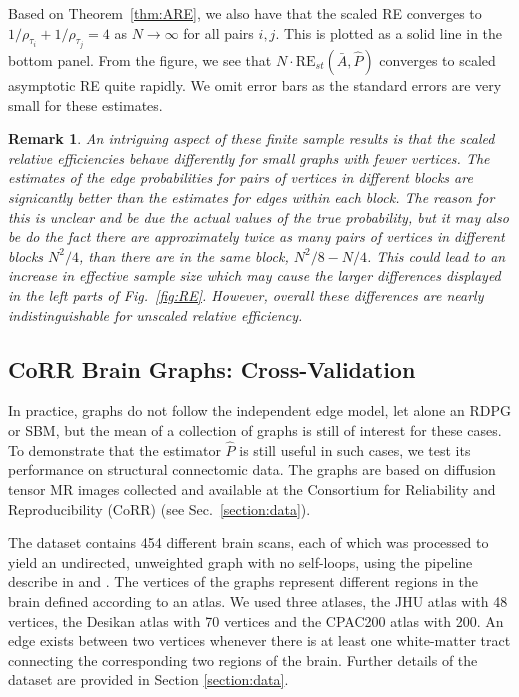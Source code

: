 \documentclass[10pt,letterpaper]{article}
\newtheorem{remark}[fact]{Remark}
\begin{document}
Based on Theorem~\ref{thm:ARE}, we also have that the scaled RE converges to $1/\rho_{\tau_i}+1/\rho_{\tau_j}=4$ as $N\to\infty$ for all pairs $i,j$.
This is plotted as a solid line in the bottom panel.
From the figure, we see that $N \cdot \mathrm{RE}_{st}(\bar{A}, \hat{P})$ converges to scaled asymptotic RE quite rapidly.
We omit error bars as the standard errors are very small for these estimates.

\begin{remark}
An intriguing aspect of these finite sample results is that the scaled relative efficiencies behave differently for small graphs with fewer vertices. 
The estimates of the edge probabilities for pairs of vertices in different blocks are signicantly better than the estimates for edges within each block.
The reason for this is unclear and be due the actual values of the true probability, but it may also be do the fact there are approximately twice as many pairs of vertices in different blocks $N^2/4$, than there are in the same block, $N^2/8-N/4$.
This could lead to an increase in effective sample size which may cause the larger differences displayed in the left parts of Fig.~\ref{fig:RE}.
However, overall these differences are nearly indistinguishable for unscaled relative efficiency.
\end{remark}


\subsection{CoRR Brain Graphs: Cross-Validation}\label{sec:corr_data}

In practice, graphs do not follow the independent edge model, let alone an RDPG or SBM, but the mean of a collection of graphs is still of interest for these cases.
To demonstrate that the estimator $\hat{P}$ is still useful in such cases, we test its performance on structural connectomic data. 
The graphs are based on diffusion tensor MR images collected and available at the Consortium for Reliability and Reproducibility (CoRR) \citep{zuo2014open, gorgolewski2015high} (see Sec.~\ref{section:data}).

The dataset contains 454 different brain scans, each of which was processed to yield an undirected, unweighted graph with no self-loops, using the pipeline describe in \citet{gray2013migraine} and \citet{kiar2016m2g}.
The vertices of the graphs represent different regions in the brain defined according to an atlas.
We used three atlases, the JHU atlas with 48 vertices, the Desikan atlas with 70 vertices and the  CPAC200 atlas with 200.
An edge exists between two vertices whenever there is at least one white-matter tract connecting the corresponding two regions of the brain. 
Further details of the dataset are provided in Section \ref{section:data}.
\end{document}
